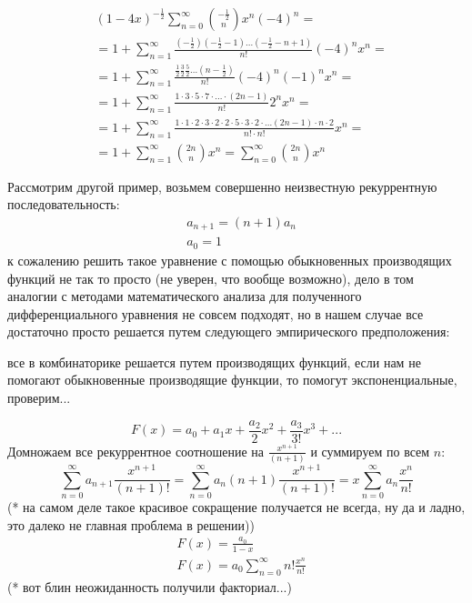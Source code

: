 \[
	\begin{split}
		& \left(1 - 4 x\right)^{-\frac{1}{2}} \sum_{n=0}^{\infty} \binom{-\frac{1}{2}}{n} x^n \left(-4\right)^n = \\
		& = 1 + \sum_{n=1}^{\infty} \frac{\left(-\frac{1}{2}\right)\left(-\frac{1}{2} - 1\right) ... \left(-\frac{1}{2} - n + 1\right)}{n!} \left(-4\right)^n x^n = \\
		& = 1 + \sum_{n=1}^{\infty} \frac{\frac{1}{2} \frac{3}{2} \frac{5}{2} ... \left(n - \frac{1}{2}\right)}{n!} \left(-4\right)^n \left(-1\right)^n x^n = \\
		& =  1 + \sum_{n=1}^{\infty} \frac{1\cdot3 \cdot5 \cdot 7 \cdot ... \cdot \left(2 n - 1\right)}{n!} 2^n x^n = \\
		& = 1 + \sum_{n=1}^{\infty} \frac{1 \cdot 1 \cdot 2 \cdot 3 \cdot 2 \cdot 2 \cdot 5 \cdot 3 \cdot 2 \cdot ... \left(2 n - 1\right) \cdot n \cdot 2}{n! \cdot n!} x^n = \\
		& =  1 + \sum_{n=1}^{\infty} \binom{2n}{n} x^n = \sum_{n=0}^{\infty} \binom{2n}{n} x^n
	\end{split}
\]

Рассмотрим другой пример, возьмем совершенно неизвестную рекуррентную последовательность:
\[
	\begin{split}
		& a_{n+1} = \left(n+1\right) a_n \\
		& a_0 = 1
	\end{split}
\]
к сожалению решить такое уравнение с помощью обыкновенных производящих функций не так то просто (не уверен, что вообще возможно), дело в том аналогии с методами математического анализа для полученного дифференциального уравнения не совсем подходят, но в нашем случае все достаточно просто решается путем следующего эмпирического предположения:

все в комбинаторике решается путем производящих функций, если нам не помогают обыкновенные производящие функции, то помогут экспоненциальные, проверим...

\[
	F\left(x\right) = a_0 + a_1 x + \frac{a_2}{2} x^2 + \frac{a_3}{3!} x^3 + ...
\]
Домножаем все рекуррентное соотношение на $\frac{x^{n+1}}{\left(n+1\right)}$ и суммируем по всем $n$:
\[
	\sum_{n=0}^{\infty} a_{n+1} \frac{x^{n+1}}{\left(n+1\right)!} = \sum_{n=0}^{\infty} a_n \left(n+1\right) \frac{x^{n+1}}{\left(n+1\right)!} = x \sum_{n=0}^{\infty} a_n \frac{x^n}{n!}
\]
(* на самом деле такое красивое сокращение получается не всегда, ну да и ладно, это далеко не главная проблема в решении))
\[
	\begin{split}
		& F\left(x\right) = \frac{a_0}{1 - x} \\
		& F\left(x\right) = a_0 \sum_{n=0}^{\infty} n! \frac{x^n}{n!}
	\end{split}
\]
(* вот блин неожиданность получили факториал...)

